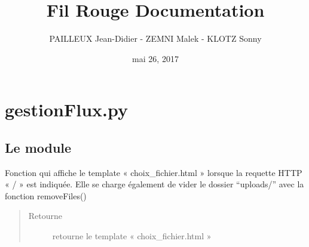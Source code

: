 \documentclass[letterpaper,10pt,openany,oneside,french]{sphinxmanual}
\title{Fil Rouge Documentation}
\date{mai 26, 2017}
\author{PAILLEUX Jean-Didier - ZEMNI Malek - KLOTZ Sonny}
\begin{document}
\maketitle
\sphinxtableofcontents
{}\label{\detokenize{index::doc}}



\chapter{gestionFlux.py}
\label{\detokenize{gestionFlux:gestionflux-py}}\label{\detokenize{gestionFlux:bienvenue-sur-la-documentation-du-projet-fil-rouge}}\label{\detokenize{gestionFlux::doc}}\label{\detokenize{gestionFlux:module-interface_web.gestionFlux}}

\section{Le module }
\label{\detokenize{gestionFlux:le-module-gestion-des-flux}}

\begin{fulllineitems}
\label{\detokenize{gestionFlux:interface_web.gestionFlux.fenetre_choix_fichier}}
Fonction qui affiche le template « choix\_fichier.html » lorsque la requette HTTP « / » est indiquée. Elle se charge également de vider le 
dossier “uploads/” avec la fonction removeFiles()
\begin{quote}\begin{description}
\item[{Retourne}] \leavevmode
retourne le template « choix\_fichier.html »

\end{description}\end{quote}

\end{fulllineitems}

\end{document}

